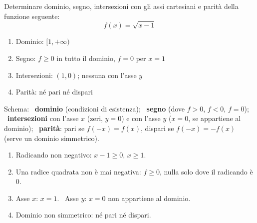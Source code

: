 \begin{question}[ID=1.6, subtitle={Studio di una funzione radicale}, difficulty=facile, tags={funzioni, studio di funzione, radicali}]
Determinare dominio, segno, intersezioni con gli assi cartesiani e parità della funzione seguente:
\begin{equation*}
    f(x)=\sqrt{x-1}
\end{equation*}
\begin{solution}
\begin{enumerate}
    \item Dominio: $[1,+\infty)$
    \item Segno: $f\geq0$ in tutto il dominio, $f=0$ per $x=1$
    \item Intersezioni: $(1,0)$; nessuna con l'asse $y$
    \item Parità: né pari né dispari
\end{enumerate}
\end{solution}
\begin{explanation}
Schema: \ \textbf{dominio} (condizioni di esistenza); \ \textbf{segno} (dove $f>0$, $f<0$, $f=0$); \ \textbf{intersezioni} con l'asse $x$ (zeri, $y=0$) e con l'asse $y$ ($x=0$, se appartiene al dominio); \ \textbf{parità}: pari se $f(-x)=f(x)$, dispari se $f(-x)=-f(x)$ (serve un dominio simmetrico).
\begin{enumerate}
    \item Radicando non negativo: $x-1\geq0$, $x\geq1$.
    \item Una radice quadrata non è mai negativa: $f\geq0$, nulla solo dove il radicando è $0$.
    \item Asse $x$: $x=1$. \ Asse $y$: $x=0$ non appartiene al dominio.
    \item Dominio non simmetrico: né pari né dispari.
\end{enumerate}
\end{explanation}
\end{question}


